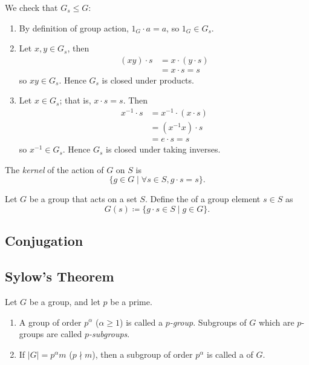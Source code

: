 We check that $G_s\le G$:
\begin{enumerate}[label=(\roman*)]
\item By definition of group action, $1_G\cdot a=a$, so $1_G\in G_s$.
\item Let $x,y\in G_s$, then
\begin{align*}
(xy)\cdot s&=x\cdot(y\cdot s)\\
&=x\cdot s=s
\end{align*}
so $xy\in G_s$. Hence $G_s$ is closed under products.
\item Let $x\in G_s$; that is, $x\cdot s=s$. Then
\begin{align*}
x^{-1}\cdot s&=x^{-1}\cdot(x\cdot s)\\
&=(x^{-1}x)\cdot s\\
&=e\cdot s=s
\end{align*}
so $x^{-1}\in G_s$. Hence $G_s$ is closed under taking inverses.
\end{enumerate}

\begin{definition}
The \emph{kernel} of the action of $G$ on $S$ is
\[\{g\in G\mid\forall s\in S, g\cdot s=s\}.\]
\end{definition}

\begin{definition}[Orbit]
Let $G$ be a group that acts on a set $S$. Define the  of a group element $s\in S$ as
\[G(s)\coloneqq\{g\cdot s\in S\mid g\in G\}.\]
\end{definition}

\subsection{Conjugation}

\subsection{Sylow's Theorem}
\begin{definition}
Let $G$ be a group, and let $p$ be a prime.
\begin{enumerate}[label=(\roman*)]
\item A group of order $p^\alpha$ ($\alpha\ge1$) is called a \emph{$p$-group}. Subgroups of $G$ which are $p$-groups are called \emph{$p$-subgroups}.
\item If $|G|=p^\alpha m$ ($p\nmid m$), then a subgroup of order $p^\alpha$ is called a  of $G$.
\end{enumerate}
\end{definition}

